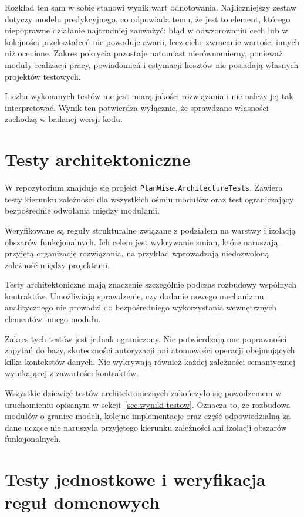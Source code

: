 Rozkład ten sam w sobie stanowi wynik wart odnotowania. Najliczniejszy zestaw dotyczy modelu predykcyjnego, co odpowiada temu, że jest to element, którego niepoprawne działanie najtrudniej zauważyć: błąd w odwzorowaniu cech lub w kolejności przekształceń nie powoduje awarii, lecz ciche zwracanie wartości innych niż ocenione. Zakres pokrycia pozostaje natomiast nierównomierny, ponieważ moduły realizacji pracy, powiadomień i estymacji kosztów nie posiadają własnych projektów testowych.

Liczba wykonanych testów nie jest miarą jakości rozwiązania i nie należy jej tak interpretować. Wynik ten potwierdza wyłącznie, że sprawdzane własności zachodzą w badanej wersji kodu.

\section{Testy architektoniczne}

W repozytorium znajduje się projekt \texttt{PlanWise.ArchitectureTests}. Zawiera testy kierunku zależności dla wszystkich ośmiu modułów oraz test ograniczający bezpośrednie odwołania między modułami.

Weryfikowane są reguły strukturalne związane z podziałem na warstwy i izolacją obszarów funkcjonalnych. Ich celem jest wykrywanie zmian, które naruszają przyjętą organizację rozwiązania, na przykład wprowadzają niedozwoloną zależność między projektami.

Testy architektoniczne mają znaczenie szczególnie podczas rozbudowy wspólnych kontraktów. Umożliwiają sprawdzenie, czy dodanie nowego mechanizmu analitycznego nie prowadzi do bezpośredniego wykorzystania wewnętrznych elementów innego modułu.

Zakres tych testów jest jednak ograniczony. Nie potwierdzają one poprawności zapytań do bazy, skuteczności autoryzacji ani atomowości operacji obejmujących kilka kontekstów danych. Nie wykrywają również każdej zależności semantycznej wynikającej z zawartości kontraktów.

Wszystkie dziewięć testów architektonicznych zakończyło się powodzeniem w uruchomieniu opisanym w sekcji~\ref{sec:wyniki-testow}. Oznacza to, że rozbudowa modułów o granice modeli, kolejne implementacje oraz część odpowiedzialną za dane uczące nie naruszyła przyjętego kierunku zależności ani izolacji obszarów funkcjonalnych.

\section{Testy jednostkowe i weryfikacja reguł domenowych}

